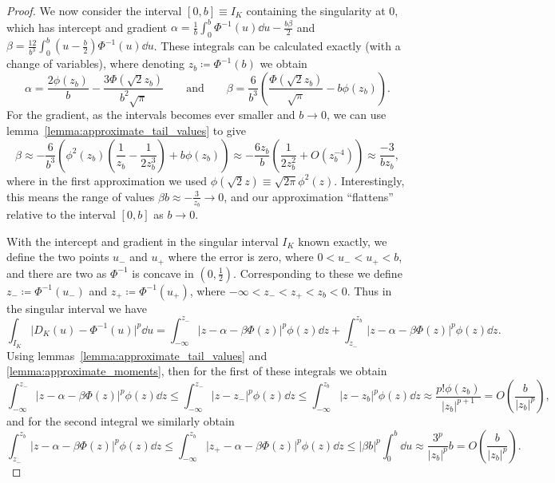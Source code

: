 \documentclass[manuscript,review]{acmart}
\begin{document}
\begin{proof}
We now consider the interval $ [0, b] \equiv I_K $ containing the singularity at 0, which has intercept and gradient
$ \alpha = \tfrac{1}{b} \int_{0}^{b} \Phi^{-1}(u) \dd{u} - \tfrac{b\beta}{2}  $
and 
$ \beta  = \tfrac{12}{b^3} \int_{0}^{b} (u - \tfrac{b}{2}) \Phi^{-1}(u) \dd{u} $.
These integrals can be calculated exactly (with a change of variables), where denoting $ z_b \coloneqq \Phi^{-1}(b) $ we obtain
\begin{equation*}
\alpha = \dfrac{2\phi(z_b)}{b} - \dfrac{3\Phi(\sqrt{2}z_b)}{b^2\sqrt{\pi}}
\qquad \text{and} \qquad 
\beta  = \dfrac{6}{b^3} \left(\dfrac{\Phi(\sqrt{2} z_b)}{\sqrt{\pi}} - b\phi(z_b)\right).
\end{equation*}
For the gradient, as the intervals becomes ever smaller and $ b \to 0 $, we can use lemma~\ref{lemma:approximate_tail_values} to give
\begin{equation*}
\beta  
\approx -\dfrac{6}{b^3} \left(\phi^2(z_b)\left(\dfrac{1}{z_b} - \dfrac{1}{2 z_b^3}\right) + b \phi(z_b)\right)
\approx -\dfrac{6z_b}{b}\left(\dfrac{1}{2z_b^2} + O(z_b^{-4})\right)
\approx \dfrac{-3}{bz_b},
\end{equation*}
where in the first approximation we used  $ \phi(\sqrt{2}z) \equiv \sqrt{2\pi}\phi^2(z) $. Interestingly, this means the range of values $ \beta b \approx -\tfrac{3}{z_b} \to 0 $, and our approximation ``flattens'' relative to the interval $ [0, b] $ as $ b \to 0 $.

With the intercept and gradient in the singular interval $ I_K $ known exactly, we define the two points $ u_- $ and $ u_+ $ where the error is zero, where $ 0 < u_- < u_+ < b $, and there are two as $ \Phi^{-1} $ is concave in $ (0, \tfrac{1}{2}) $. Corresponding to these we define $ z_- \coloneqq \Phi^{-1}(u_-) $ and $ z_+ \coloneqq \Phi^{-1}(u_+) $, where $ -\infty < z_- < z_+ < z_b < 0 $. Thus in the singular interval we have
\begin{equation*}
\int_{I_K} \lvert D_K(u) - \Phi^{-1}(u)\rvert^p \dd{u} 
= \int_{-\infty}^{z_-} \lvert z - \alpha - \beta \Phi(z)\rvert^p \phi(z) \dd{z} + \int_{z_-}^{z_b} \lvert z - \alpha - \beta \Phi(z)\rvert^p \phi(z) \dd{z}.
\end{equation*}
Using lemmas~\ref{lemma:approximate_tail_values} and \ref{lemma:approximate_moments}, then for the first of these integrals we obtain
\begin{equation*}
\int_{-\infty}^{z_-} \lvert z - \alpha - \beta \Phi(z)\rvert^p \phi(z) \dd{z}
\leq \int_{-\infty}^{z_-} \lvert z - z_-\rvert^p \phi(z) \dd{z}
\leq \int_{-\infty}^{z_b} \lvert z - z_b\rvert^p \phi(z) \dd{z}
\approx  \dfrac{p!\phi(z_b)}{\lvert z_b\rvert^{p+1}}
=  O\left(\dfrac{b}{\lvert z_b \rvert^p}\right),
\end{equation*}
and for the second integral we similarly obtain
\begin{equation*}
\int_{z_-}^{z_b} \lvert z - \alpha - \beta \Phi(z)\rvert^p \phi(z) \dd{z}
\leq \int_{-\infty}^{z_b} \lvert z_+ - \alpha - \beta \Phi(z)\rvert^p \phi(z) \dd{z}
\leq \lvert \beta b \rvert^p \int_{0}^{b}\dd{u}
\approx \dfrac{3^p}{\lvert z_b\rvert^p} b
=  O\left(\dfrac{b}{\lvert z_b \rvert^p}\right).
\end{equation*}


\end{proof}
\end{document}
